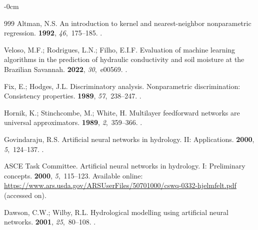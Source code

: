 \documentclass[land,review,accept,pdftex,oneauthor]{Definitions/mdpi}
\begin{document}
\begin{adjustwidth}{-\extralength}{0cm}
\begin{thebibliography}{999}
Altman, N.S.
\newblock An introduction to kernel and nearest-neighbor nonparametric
  regression.
 {\bf 1992}, {\em 46},~175--185.
.

Veloso, M.F.; Rodrigues, L.N.; Filho, E.I.F.
\newblock Evaluation of machine learning algorithms in the prediction of
  hydraulic conductivity and soil moisture at the Brazilian Savannah.
 {\bf 2022}, {\em 30},~e00569.
.

Fix, E.; Hodges, J.L.
\newblock Discriminatory analysis. Nonparametric discrimination: Consistency
  properties.
 {\bf 1989}, {\em
  57},~238--247.
.

Hornik, K.; Stinchcombe, M.; White, H.
\newblock Multilayer feedforward networks are universal approximators.
 {\bf 1989}, {\em 2},~359--366.
.

Govindaraju, R.S.
\newblock Artificial neural networks in hydrology. II: Applications.
 {\bf 2000}, {\em
  5},~124--137.
.

{ASCE Task Committee}.
\newblock Artificial neural networks in hydrology. I: Preliminary concepts.
 {\bf 2000}, {\em
  5},~115--123.
\newblock
  Available online: {\url{https://www.ars.usda.gov/ARSUserFiles/50701000/cswq-0332-hjelmfelt.pdf}} (accessed on).  %

Dawson, C.W.; Wilby, R.L.
\newblock Hydrological modelling using artificial neural networks.
 {\bf 2001}, {\em 25},~80--108.
.


\end{thebibliography}
\end{adjustwidth}
\end{document}

